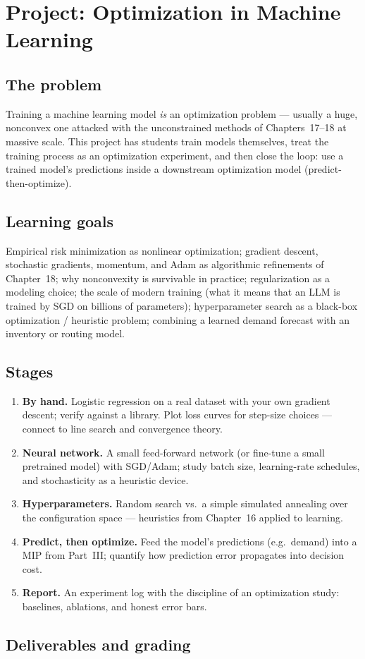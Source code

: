\chapter{Project: Optimization in Machine Learning}
\label{ch:project-ml}

\section*{The problem}
Training a machine learning model \emph{is} an optimization problem —
usually a huge, nonconvex one attacked with the unconstrained methods of
Chapters~17--18 at massive scale. This project has students train models
themselves, treat the training process as an optimization experiment, and
then close the loop: use a trained model's predictions inside a
downstream optimization model (predict-then-optimize).

\section*{Learning goals}
Empirical risk minimization as nonlinear optimization; gradient descent,
stochastic gradients, momentum, and Adam as algorithmic refinements of
Chapter~18; why nonconvexity is survivable in practice; regularization as
a modeling choice; the scale of modern training (what it means that an LLM
is trained by SGD on billions of parameters); hyperparameter search as a
black-box optimization / heuristic problem; combining a learned demand
forecast with an inventory or routing model.

\section*{Stages}
\begin{enumerate}
  \item \textbf{By hand.} Logistic regression on a real dataset with your
    own gradient descent; verify against a library. Plot loss curves for
    step-size choices — connect to line search and convergence theory.
  \item \textbf{Neural network.} A small feed-forward network (or
    fine-tune a small pretrained model) with SGD/Adam; study batch size,
    learning-rate schedules, and stochasticity as a heuristic device.
  \item \textbf{Hyperparameters.} Random search vs.\ a simple simulated
    annealing over the configuration space — heuristics from Chapter~16
    applied to learning.
  \item \textbf{Predict, then optimize.} Feed the model's predictions
    (e.g.\ demand) into a MIP from Part~III; quantify how prediction error
    propagates into decision cost.
  \item \textbf{Report.} An experiment log with the discipline of an
    optimization study: baselines, ablations, and honest error bars.
\end{enumerate}

\section*{Deliverables and grading}
